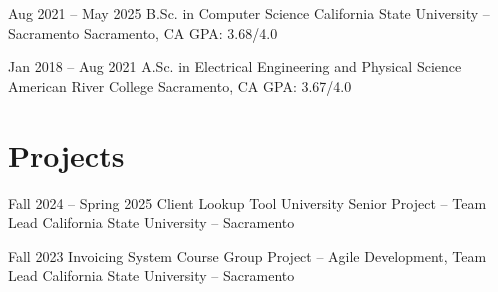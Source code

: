 \documentclass[11pt]{moderncv}
\begin{document}
\cventry
    {Aug 2021 -- May 2025}
    {B.Sc. in Computer Science}
    {California State University -- Sacramento}
    {Sacramento, CA}
    {GPA: 3.68/4.0}
    {}

\cventry
    {Jan 2018 -- Aug 2021}
    {A.Sc. in Electrical Engineering and Physical Science}
    {American River College}
    {Sacramento, CA}
    {GPA: 3.67/4.0}
    {}
 \section{Projects}

\cventry
    {Fall 2024 -- Spring 2025}
    {Client Lookup Tool}
    {University Senior Project -- Team Lead}
    {California State University -- Sacramento}
    {}
    {}

\cventry
    {Fall 2023}
    {Invoicing System}
    {Course Group Project -- Agile Development, Team Lead}
    {California State University -- Sacramento}
    {}
    {}
  
\end{document}
